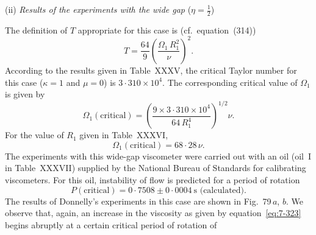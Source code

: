 

\medskip
\noindent (ii) \textit{Results of the experiments with the wide gap} ($\eta = \frac{1}{2}$)

The definition of $T$ appropriate for this case is (cf.\ equation~(314))
\begin{equation}\label{eq:7-330}
T = \frac{64}{9}\!\left(\frac{\Omega_1\,R_1^2}{\nu}\right)^{\!2}.
\end{equation}
According to the results given in Table~XXXV, the critical Taylor
number for this case ($\kappa = 1$ and $\mu = 0$) is $3{\cdot}310 \times 10^4$.  The corresponding
critical value of $\Omega_1$ is given by
\begin{equation}\label{eq:7-331}
\Omega_1(\text{critical}) = \left(\frac{9 \times 3{\cdot}310 \times 10^4}{64\,R_1^4}\right)^{1/2}\!\nu.
\end{equation}
For the value of $R_1$ given in Table~XXXVI,
\begin{equation}\label{eq:7-332}
\Omega_1(\text{critical}) = 68{\cdot}28\,\nu.
\end{equation}
The experiments with this wide-gap viscometer were carried out with
an oil (oil~I in Table~XXXVII) supplied by the National Bureau of
Standards for calibrating viscometers.  For this oil, instability of flow
is predicted for a period of rotation
\begin{equation}\label{eq:7-333}
P(\text{critical}) = 0{\cdot}7508 \pm 0{\cdot}0004~\text{s (calculated)}.
\end{equation}
The results of Donnelly's experiments in this case are shown in Fig.~79\,$a$, $b$.  We observe that, again, an increase in the viscosity as given by
equation~\eqref{eq:7-323} begins abruptly at a certain critical period of rotation of


